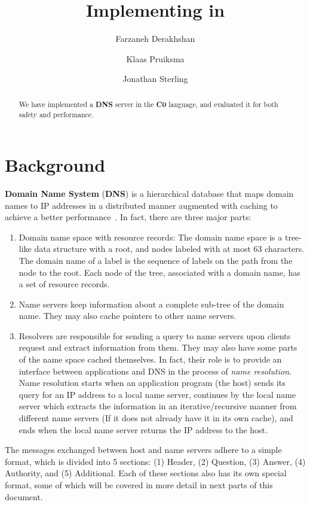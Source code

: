\documentclass{article}
\title{Implementing \Kwd{DNS} in \Kwd{C0}}
\author{Farzaneh Derakhshan \and Klaas Pruiksma \and Jonathan Sterling}
\newcommand\Kwd[1]{{\sffamily\bfseries{#1}}}
\begin{document}
\maketitle

\begin{abstract}
  We have implemented a \Kwd{DNS} server in the \Kwd{C0} language, and
  evaluated it for both safety and performance.
\end{abstract}

\section{Background}


\Kwd{Domain Name System} (\Kwd{DNS}) is a hierarchical database that
maps domain names to IP addresses in a distributed manner augmented
with caching to achieve a better
performance~\citep{rfc:1034,rfc:1035,mun-lee:2005}. In fact, there are
three major parts:

\begin{enumerate}
\item Domain name space with resource records: The domain name space
  is a tree-like data structure with a root, and nodes labeled with at
  most 63 characters. The domain name of a label is the sequence of
  labels on the path from the node to the root. Each node of the tree,
  associated with a domain name, has a set of resource records.

\item Name servers keep information about a complete sub-tree of the
  domain name. They may also cache pointers to other name
  servers.

\item Resolvers are responsible for sending a query to name servers
  upon clients request and extract information from them. They may
  also have some parts of the name space cached themselves.  In fact,
  their role is to provide an interface between applications and DNS
  in the process of \emph{name resolution}. Name resolution starts
  when an application program (the host) sends its query for an IP
  address to a local name server, continues by the local name server
  which extracts the information in an iterative/recursive manner from
  different name servers (If it does not already have it in its own
  cache), and ends when the local name server returns the IP address
  to the host.
\end{enumerate}

The messages exchanged between host and name servers adhere to a
simple format, which is divided into 5 sections: (1) Header, (2)
Question, (3) Answer, (4) Authority, and (5) Additional.  Each of
these sections also has its own special format, some of which will be
covered in more detail in next parts of this document.
\end{document}
